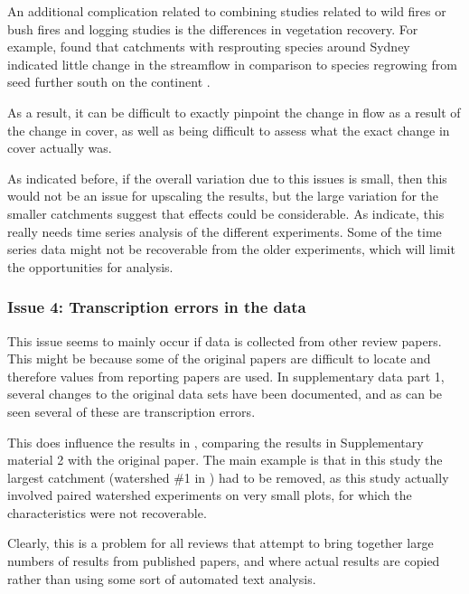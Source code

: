 \documentclass[]{elsarticle} %
\begin{document}
An additional complication related to combining studies related to wild fires or bush fires and logging studies is the differences in vegetation recovery. For example, \citet{heath2014} found that catchments with resprouting species around Sydney indicated little change in the streamflow in comparison to species regrowing from seed further south on the continent \citet{zhou2015bushfire}.

As a result, it can be difficult to exactly pinpoint the change in flow as a result of the change in cover, as well as being difficult to assess what the exact change in cover actually was.

As indicated before, if the overall variation due to this issues is small, then this would not be an issue for upscaling the results, but the large variation for the smaller catchments suggest that effects could be considerable. As \citet{jones2017} indicate, this really needs time series analysis of the different experiments. Some of the time series data might not be recoverable from the older experiments, which will limit the opportunities for analysis.

\hypertarget{issue-4-transcription-errors-in-the-data}{%
\subsubsection{Issue 4: Transcription errors in the data}\label{issue-4-transcription-errors-in-the-data}}

This issue seems to mainly occur if data is collected from other review papers. This might be because some of the original papers are difficult to locate and therefore values from reporting papers are used. In supplementary data part 1, several changes to the original data sets have been documented, and as can be seen several of these are transcription errors.

This does influence the results in \citet{zhang2017}, comparing the results in Supplementary material 2 with the original paper. The main example is that in this study the largest catchment (watershed \#1 in \citet{zhang2017}) had to be removed, as this study actually involved paired watershed experiments on very small plots, for which the characteristics were not recoverable.

Clearly, this is a problem for all reviews that attempt to bring together large numbers of results from published papers, and where actual results are copied rather than using some sort of automated text analysis.
\end{document}
